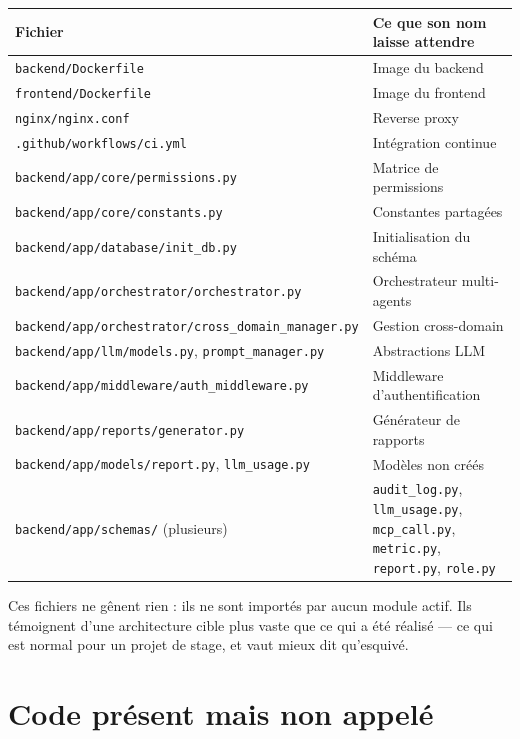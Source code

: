 \documentclass[11pt,a4paper]{report}
\newcommand{\file}[1]{\texttt{\small #1}}
\begin{document}
\begin{longtable}{@{}p{7.4cm}p{7.4cm}@{}}
\toprule
\textbf{Fichier} & \textbf{Ce que son nom laisse attendre}\\
\midrule
\endhead
\file{backend/Dockerfile} & Image du backend\\
\file{frontend/Dockerfile} & Image du frontend\\
\file{nginx/nginx.conf} & Reverse proxy\\
\file{.github/workflows/ci.yml} & Intégration continue\\
\file{backend/app/core/permissions.py} & Matrice de permissions\\
\file{backend/app/core/constants.py} & Constantes partagées\\
\file{backend/app/database/init\_db.py} & Initialisation du schéma\\
\file{backend/app/orchestrator/orchestrator.py} & Orchestrateur multi-agents\\
\file{backend/app/orchestrator/cross\_domain\_manager.py} & Gestion cross-domain\\
\file{backend/app/llm/models.py}, \file{prompt\_manager.py} & Abstractions LLM\\
\file{backend/app/middleware/auth\_middleware.py} & Middleware d'authentification\\
\file{backend/app/reports/generator.py} & Générateur de rapports\\
\file{backend/app/models/report.py}, \file{llm\_usage.py} & Modèles non créés\\
\file{backend/app/schemas/} (plusieurs) & \file{audit\_log.py}, \file{llm\_usage.py}, \file{mcp\_call.py}, \file{metric.py}, \file{report.py}, \file{role.py}\\
\bottomrule
\end{longtable}

\begin{infobox}
Ces fichiers ne gênent rien : ils ne sont importés par aucun module actif. Ils
témoignent d'une architecture cible plus vaste que ce qui a été réalisé --- ce
qui est normal pour un projet de stage, et vaut mieux dit qu'esquivé.
\end{infobox}

\section{Code présent mais non appelé}
\end{document}
